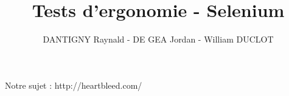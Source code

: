 \documentclass[a4paper,oneside,1pt]{article}
\title{Tests d'ergonomie - Selenium}
\author{DANTIGNY Raynald - DE GEA Jordan - William DUCLOT}
\begin{document}








Notre sujet : http://heartbleed.com/
\end{document}
